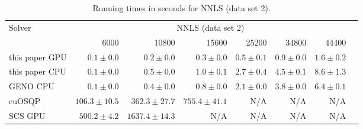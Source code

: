 
\begin{table}[h!]
\begin{center}
  \small
 
  \begin{tabular}{l*{7}{r}}
    \toprule
    \multirow{2}{*}{Solver} & \multicolumn{6}{c}{NNLS (data set 2)} \\
    \cmidrule{2-7}
                   & 6000             & 10800            & 15600          & 25200        & 34800        & 44400 \\
    \midrule                                                                                            
    this paper GPU & $0.1\pm 0.0$     & $0.2\pm 0.0$     & $0.3\pm 0.0$   & $0.5\pm 0.1$ & $0.9\pm 0.0$ & $1.6\pm 0.2$ \\
    this paper CPU & $0.1\pm 0.0$     & $0.5\pm 0.0$     & $1.0\pm 0.1$   & $2.7\pm 0.4$ & $4.5\pm 0.1$ & $8.6\pm 1.3$ \\
    GENO CPU       & $0.1\pm 0.0$     & $0.4\pm 0.0$     & $0.8\pm 0.0$   & $2.1\pm 0.0$ & $3.8\pm 0.0$ & $6.4\pm 0.1$ \\
    cuOSQP         & $106.3\pm 10.5$  & $362.3\pm 27.7$  & $755.4\pm 41.1$ & N/A & N/A & N/A  \\
    SCS GPU        & $500.2\pm 4.2$   & $1637.4\pm 14.3$ & N/A & N/A & N/A & N/A \\
    \bottomrule
  \end{tabular}%
  \caption{Running times in seconds for NNLS (data set 2).}
  \end{center}
\end{table}
